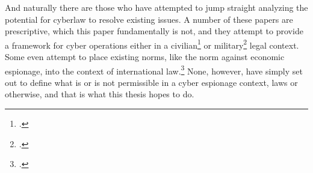 \documentclass{memoir}
\begin{document}
\begin{refsegment}
And naturally there are those who have attempted to jump straight analyzing the potential for cyberlaw to resolve existing issues. A number of these papers are prescriptive, which this paper fundamentally is not, and they attempt to provide a framework for cyber operations either in a civilian\footcite{yurcik_internet_2001} or military\footcite{kehler_rules_2017} legal context. Some even attempt to place existing norms, like the norm against economic espionage, into the context of international law.\footcite{lotrionte_countering_2015} None, however, have simply set out to define what is or is not permissible in a cyber espionage context, laws or otherwise, and that is what this thesis hopes to do.





\end{refsegment}
\end{document}
